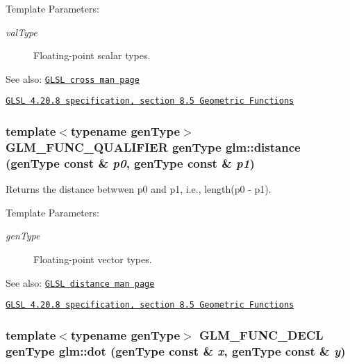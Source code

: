\begin{Desc}
\item[Template Parameters:]
\begin{description}
\item[{\em valType}]Floating-point scalar types.\end{description}
\end{Desc}
\begin{Desc}
\item[See also:]\href{http://www.opengl.org/sdk/docs/manglsl/xhtml/cross.xml}{\tt GLSL cross man page} 

\href{http://www.opengl.org/registry/doc/GLSLangSpec.4.20.8.pdf}{\tt GLSL 4.20.8 specification, section 8.5 Geometric Functions} \end{Desc}
\hypertarget{group__core__func__geometric_gd21e00cab9f8b4eb6d1214a16dee06c7}{
\subsubsection[distance]{\setlength{\rightskip}{0pt plus 5cm}template$<$typename genType$>$ GLM\_\-FUNC\_\-QUALIFIER genType glm::distance (genType const \& {\em p0}, \/  genType const \& {\em p1})}}
\label{group__core__func__geometric_gd21e00cab9f8b4eb6d1214a16dee06c7}


Returns the distance betwwen p0 and p1, i.e., length(p0 - p1).

\begin{Desc}
\item[Template Parameters:]
\begin{description}
\item[{\em genType}]Floating-point vector types.\end{description}
\end{Desc}
\begin{Desc}
\item[See also:]\href{http://www.opengl.org/sdk/docs/manglsl/xhtml/distance.xml}{\tt GLSL distance man page} 

\href{http://www.opengl.org/registry/doc/GLSLangSpec.4.20.8.pdf}{\tt GLSL 4.20.8 specification, section 8.5 Geometric Functions} \end{Desc}
\hypertarget{group__core__func__geometric_g93acafc6005a3433ccf1dc3fa4230d51}{
\subsubsection[dot]{\setlength{\rightskip}{0pt plus 5cm}template$<$typename genType$>$ GLM\_\-FUNC\_\-DECL genType glm::dot (genType const \& {\em x}, \/  genType const \& {\em y})}}
\label{group__core__func__geometric_g93acafc6005a3433ccf1dc3fa4230d51}


